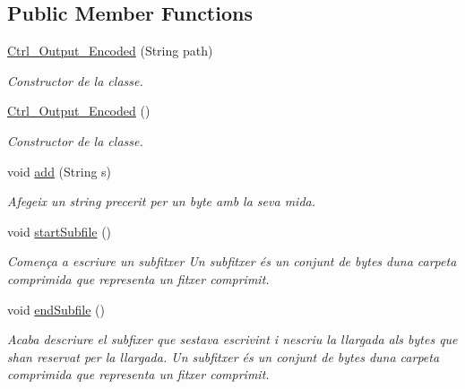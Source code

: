 \subsection*{Public Member Functions}
\begin{DoxyCompactItemize}
\item 
\hyperlink{classpersistencia_1_1output_1_1Ctrl__Output__Encoded_adf87a2fd9d945fea928324f09866e889}{Ctrl\+\_\+\+Output\+\_\+\+Encoded} (String path)
\begin{DoxyCompactList}\small\item\em Constructor de la classe. \end{DoxyCompactList}\item 
\hyperlink{classpersistencia_1_1output_1_1Ctrl__Output__Encoded_a996c8ce9df090ce109c90986390d8680}{Ctrl\+\_\+\+Output\+\_\+\+Encoded} ()
\begin{DoxyCompactList}\small\item\em Constructor de la classe. \end{DoxyCompactList}\item 
void \hyperlink{classpersistencia_1_1output_1_1Ctrl__Output__Encoded_a840c4e8c37c76677a0c4f5739649291d}{add} (String s)
\begin{DoxyCompactList}\small\item\em Afegeix un string precerit per un byte amb la seva mida. \end{DoxyCompactList}\item 
void \hyperlink{classpersistencia_1_1output_1_1Ctrl__Output__Encoded_a2cabdf68c3f3a5731933f78609d9c302}{start\+Subfile} ()
\begin{DoxyCompactList}\small\item\em Comença a escriure un subfitxer Un subfitxer és un conjunt de bytes d\textquotesingle{}una carpeta comprimida que representa un fitxer comprimit. \end{DoxyCompactList}\item 
void \hyperlink{classpersistencia_1_1output_1_1Ctrl__Output__Encoded_a3864fa867e7533f3d0d82b8f6513dae1}{end\+Subfile} ()
\begin{DoxyCompactList}\small\item\em Acaba d\textquotesingle{}escriure el subfixer que s\textquotesingle{}estava escrivint i n\textquotesingle{}escriu la llargada als bytes que s\textquotesingle{}han reservat per la llargada. Un subfitxer és un conjunt de bytes d\textquotesingle{}una carpeta comprimida que representa un fitxer comprimit. \end{DoxyCompactList}\end{DoxyCompactItemize}
